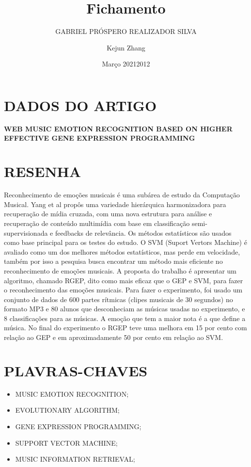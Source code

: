 \documentclass{article}
\title{Fichamento}
\author{GABRIEL PRÓSPERO REALIZADOR  SILVA}
\date{Março 2021}
\begin{document}
\maketitle

\section{DADOS DO ARTIGO}
\textbf{WEB MUSIC EMOTION RECOGNITION BASED ON HIGHER EFFECTIVE GENE EXPRESSION PROGRAMMING \\}
\author{Kejun Zhang\\}
\date{2012}

\section{RESENHA}
Reconhecimento de emoções musicais é uma subárea de estudo da Computação Musical. 
Yang et al propôs uma variedade hierárquica harmonizadora para recuperação de mídia cruzada, com uma nova estrutura para análise e recuperação de conteúdo multimídia com base em classificação semi-supervisionada e feedbacks de relevância. 
Os métodos estatísticos são usados como base principal para os testes do estudo. 
O SVM (Suport Vertors Machine) é avaliado como um dos melhores métodos estatísticos, mas perde em velocidade, também por isso a pesquisa busca encontrar um método mais eficiente no reconhecimento de emoções musicais. 
A proposta do trabalho é apresentar um algoritmo, chamado RGEP, dito como mais eficaz que o GEP e SVM, para fazer o reconhecimento das emoções musicais.
Para fazer o experimento, foi usado um conjunto de dados de 600 partes rítmicas (clipes musicais de 30 segundos) no formato MP3 e 80 alunos que desconheciam as músicas usadas no experimento, e 8 classificações para as músicas. 
A emoção que tem a maior nota é a que define a música. No final do experimento o RGEP teve uma melhora em 15 por cento com relação ao GEP e em aproximadamente 50 por cento em relação ao SVM.

\section{PLAVRAS-CHAVES}
\begin{itemize}
    \item MUSIC EMOTION RECOGNITION; 
    \item EVOLUTIONARY ALGORITHM; 
    \item GENE EXPRESSION PROGRAMMING; 
    \item SUPPORT VECTOR MACHINE; 
    \item MUSIC INFORMATION RETRIEVAL;
\end{itemize}
\end{document}
